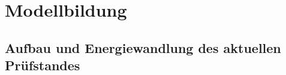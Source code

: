 \section{Modellbildung}
\label{chap:modellbildung}


\subsection{Aufbau und Energiewandlung des aktuellen Prüfstandes}
\label{sec:aufbau_ist_zustand}